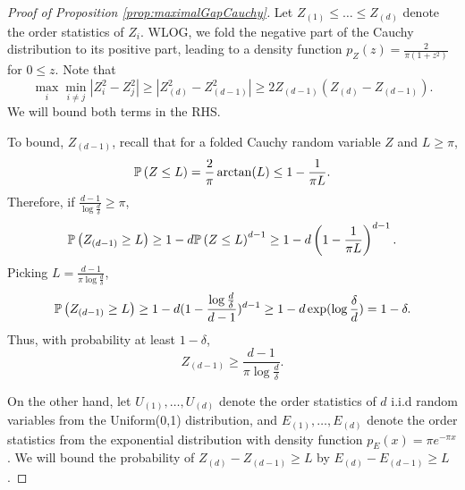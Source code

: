 \begin{proof}[Proof of Proposition \ref{prop:maximalGapCauchy}]
Let $Z_{(1)}\le \ldots \le Z_{(d)}$ denote the order statistics of $Z_i$. 
WLOG, we fold the negative part of the Cauchy distribution to its positive part, leading to a density function $p_Z(z) = \frac{2}{\pi (1+z^2)}$ for $0\le z$.
Note that 
\[
\max_i \min_{i\neq j} |Z_i^2 - Z_j^2| \ge |Z_{(d)}^2 - Z_{(d-1)}^2| \ge 2Z_{(d-1)} \left(Z_{(d)} - Z_{(d-1)}\right).
\]
We will bound both terms in the RHS.

To bound, $Z_{(d-1)}$, recall that for a folded Cauchy random variable $Z$ and $L\ge \pi$,
\[
\mathbb{P}\left(Z \le L\right) = \frac{2}{\pi} \arctan(L) \le 1- \frac{1}{\pi L}.
\] 
Therefore, if $\frac{d-1}{\log \frac{d}{\delta}} \ge \pi$,
\[
\mathbb{P}\left(Z_{(d-1)} \ge L\right) \ge 1-d\mathbb{P}\left(Z\le L\right)^{d-1} \ge 1- d\left(1-  \frac{1}{\pi L}\right)^{d-1}.
\]
Picking $L = \frac{d-1}{\pi\log \frac{d}{\delta}}$,
\[
\mathbb{P}\left(Z_{(d-1)} \ge L\right) \ge 1- d(1- \frac{\log \frac{d}{\delta}}{d-1})^{d-1} \ge 1-d\exp(\log \frac{\delta}{d}) = 1-\delta.
\]
Thus, with probability at least $1- \delta$, 
\[
Z_{(d-1)} \ge \frac{d-1}{\pi\log \frac{d}{\delta}}.
\]

On the other hand, let $U_{(1)}, \ldots, U_{(d)}$ denote the order statistics of $d$ i.i.d random variables from the Uniform(0,1) distribution, and $E_{(1)}, \ldots, E_{(d)}$ denote the order statistics from the exponential distribution with density function $p_E(x) = \pi e^{-\pi x}$. 
We will bound the probability of $Z_{(d)} - Z_{(d-1)} \ge L$ by $E_{(d)} - E_{(d-1)} \ge L$.


\end{proof}
